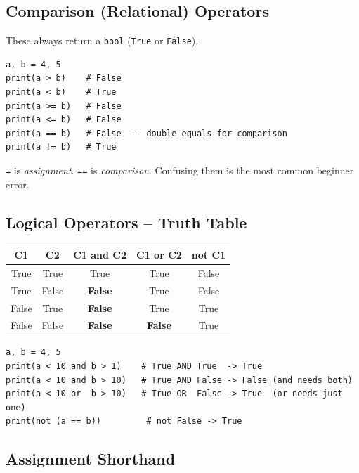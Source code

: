 \documentclass[12pt,a4paper]{article}
\newcommand{\code}[1]{\texttt{\small\color{pyblue}#1}}
\begin{document}
\subsection{Comparison (Relational) Operators}

These always return a \code{bool} (\code{True} or \code{False}).

\begin{lstlisting}
a, b = 4, 5
print(a > b)    # False
print(a < b)    # True
print(a >= b)   # False
print(a <= b)   # False
print(a == b)   # False  -- double equals for comparison
print(a != b)   # True
\end{lstlisting}

\begin{dangerbox}
\code{=} is \textit{assignment}. \code{==} is \textit{comparison}. Confusing them is the most common beginner error.
\end{dangerbox}

\subsection{Logical Operators -- Truth Table}

\begin{center}
\begin{tabular}{ccccc}
\toprule
\textbf{C1} & \textbf{C2} & \textbf{C1 and C2} & \textbf{C1 or C2} & \textbf{not C1} \\
\midrule
True & True & True & True & False \\
True & False & \textbf{False} & True & False \\
False & True & \textbf{False} & True & True \\
False & False & \textbf{False} & \textbf{False} & True \\
\bottomrule
\end{tabular}
\end{center}

\begin{lstlisting}
a, b = 4, 5
print(a < 10 and b > 1)    # True AND True  -> True
print(a < 10 and b > 10)   # True AND False -> False (and needs both)
print(a < 10 or  b > 10)   # True OR  False -> True  (or needs just one)
print(not (a == b))         # not False -> True
\end{lstlisting}

\subsection{Assignment Shorthand}
\end{document}
